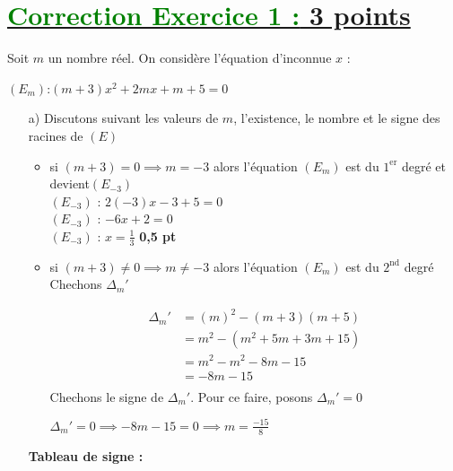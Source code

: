 \documentclass[12pt,a4paper]{article}
\begin{document}
\section*{\underline{\textcolor{green}{Correction Exercice 1 :} 3 points}}
Soit \( m \) un nombre réel. On considère l’équation d’inconnue \( x \) :

\( (E_{m}) \):\( (m+3)x^{2} +2mx + m + 5 = 0\)
\begin{enumerate}

\item[a)] Discutons suivant les valeurs de \( m \), l’existence, le nombre et le signe des racines de \( (E) \) 

\begin{itemize}
\item si \( (m+3) = 0 \implies m = -3 \) alors l'équation \( (E_{m}) \) est du $1^{\text{er}}$ degré et devient\( (E_{-3}) \)\\
\( (E_{-3}) \) : \(  2(-3)x - 3 + 5 = 0\)\\
\( (E_{-3}) \) : \(  -6x +2 = 0\)\\
\( (E_{-3}) \) : \(  x = \frac{1}{3}\) \textbf{0,5 pt}
\item si \( (m+3) \neq 0 \implies m \neq -3 \) alors l'équation \( (E_{m}) \) est du $2^{\text{nd}}$ degré\\
Chechons \(\Delta_{m}'\)

\begin{align*}
\Delta_{m}'&=(m)^{2}-(m+3)(m+5)\\
					&=m^{2}-(m^{2}+5m+3m+15)\\
					&=m^{2}-m^{2}-8m-15\\
					&=-8m-15\\
\end{align*}
Chechons le signe de \(\Delta_{m}'\). Pour ce faire, posons \(\Delta_{m}'=0\)

\( \Delta_{m}'=0 \implies -8m-15=0 \implies m=\frac{-15}{8}\) 
\end{itemize}
\vspace{0.5cm}

\noindent \textbf{Tableau de signe :}


\vspace{0.5cm}


\end{enumerate}
\end{document}
